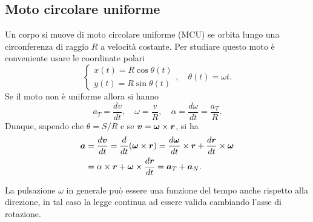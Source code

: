 \subsection{Moto circolare uniforme}
Un corpo si muove di moto circolare uniforme (MCU) se orbita lungo una circonferenza di raggio $R$ a velocità costante. Per studiare questo moto è conveniente usare le coordinate polari
\begin{equation}
    \begin{cases}
        x(t)=R\cos{\theta(t)} \\
        y(t)=R\sin{\theta(t)}
    \end{cases},\quad\theta(t)=\omega t.
\end{equation}
Se il moto non è uniforme allora si hanno
\begin{equation}
    a_T=\frac{dv}{dt},\quad\omega=\frac{v}{R},\quad\alpha=\frac{d\omega}{dt}=\frac{a_T}{R}.
\end{equation}
Dunque, sapendo che $\theta=S/R$ e se $\bm{v}=\bm{\omega}\times\bm{r}$, si ha
\begin{equation}
    \begin{split}
        \bm{a}&=\frac{d\bm{v}}{dt}=\frac{d}{dt}(\bm{\omega}\times\bm{r})=\frac{d\bm{\omega}}{dt}\times\bm{r}+\frac{d\bm{r}}{dt}\times\bm{\omega} \\
        &=\alpha\times\bm{r}+\bm{\omega}\times\frac{d\bm{r}}{dt}=\bm{a}_T+\bm{a}_N.
    \end{split}
\end{equation}
\begin{obs}
    La pulsazione $\omega$ in generale può essere una funzione del tempo anche rispetto alla direzione, in tal caso la legge continua ad essere valida cambiando l'asse di rotazione.
\end{obs}


